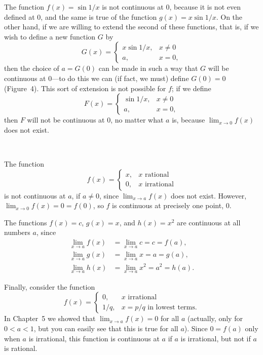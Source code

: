 The function $f(x) = \sin 1/x$ is not continuous at $0$, because it is
not even defined at $0$, and the same is true of the function
$g(x) = x \sin 1/x$. On the other hand, if we are willing to extend the
second of these functions, that is, if we wish to define a new function
$G$ by
\[
G(x) =
\begin{cases}
x \sin 1/x, & x \neq 0 \\
a,          & x = 0,
\end{cases}
\]
then the choice of $a = G(0)$ can be made in such a way that $G$ will be
continuous at $0$---to do this we can (if fact, we must) define
$G(0) = 0$ (Figure~4). This sort of extension is not possible for $f$;
if we define
\[
F(x) =
\begin{cases}
\sin 1/x, & x \neq 0 \\
a,        & x = 0,
\end{cases}
\]
then $F$ will not be continuous at $0$, no matter what $a$ is, because
$\lim_{x \to 0} f(x)$ does not exist.

\begin{center}
\\[0.6em]
\end{center}

The function
\[
f(x) =
\begin{cases}
x, & x \text{ rational} \\
0, & x \text{ irrational}
\end{cases}
\]
is not continuous at $a$, if $a \neq 0$, since $\lim_{x \to a} f(x)$
does not exist. However, $\lim_{x \to 0} f(x) = 0 = f(0)$, so $f$ is
continuous at precisely one point, $0$.

The functions $f(x) = c$, $g(x) = x$, and $h(x) = x^2$ are continuous at
all numbers $a$, since
\begin{align*}
\lim_{x \to a} f(x) &= \lim_{x \to a} c = c = f(a), \\
\lim_{x \to a} g(x) &= \lim_{x \to a} x = a = g(a), \\
\lim_{x \to a} h(x) &= \lim_{x \to a} x^2 = a^2 = h(a).
\end{align*}

Finally, consider the function
\[
f(x) =
\begin{cases}
0,    & x \text{ irrational} \\
1/q,  & x = p/q \text{ in lowest terms.}
\end{cases}
\]
In Chapter~5 we showed that $\lim_{x \to a} f(x) = 0$ for all $a$
(actually, only for $0 < a < 1$, but you can easily see that this is
true for all $a$). Since $0 = f(a)$ only when $a$ is irrational, this
function is continuous at $a$ if $a$ is irrational, but not if $a$ is
rational.

